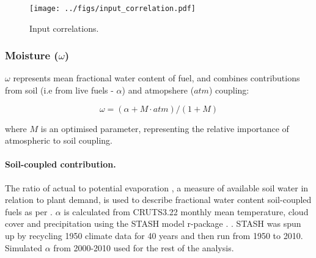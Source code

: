 \begin{figure}[!ht]
  \centering
    \texttt{[image: ../figs/input\_correlation.pdf]}
  \caption{Input correlations.}
  \label{fig:Corr_ins}
\end{figure}

\subsubsection{Moisture ($\omega$)}

$\omega$ represents mean fractional water content of fuel, and combines contributions from soil (i.e from live fuels - $\alpha$) and atmopshere ($atm$) coupling:

\begin{equation}
    \omega = (\alpha + M \cdot atm) / (1 + M)
\end{equation}

where $M$ is an optimised parameter, representing the relative importance of atmospheric to soil coupling.

\paragraph{Soil-coupled contribution.}
The ratio of actual to potential evaporation \citep[$\alpha$][]{prentice1993simulation}, a measure of available soil water in relation to plant demand, is used to describe fractional water content soil-coupled fuels as per \citet{harrison2010fire, bistinas2014causal}.
$\alpha$ is calculated from CRUTS3.22 monthly mean temperature, cloud cover and precipitation using the STASH model \citep{sykes1996bioclimatic} r-package \citep{rstash}. . STASH was spun up by recycling 1950 climate data for 40 years and then run from 1950 to 2010. Simulated $\alpha$ from 2000-2010 used for the rest of the analysis.

